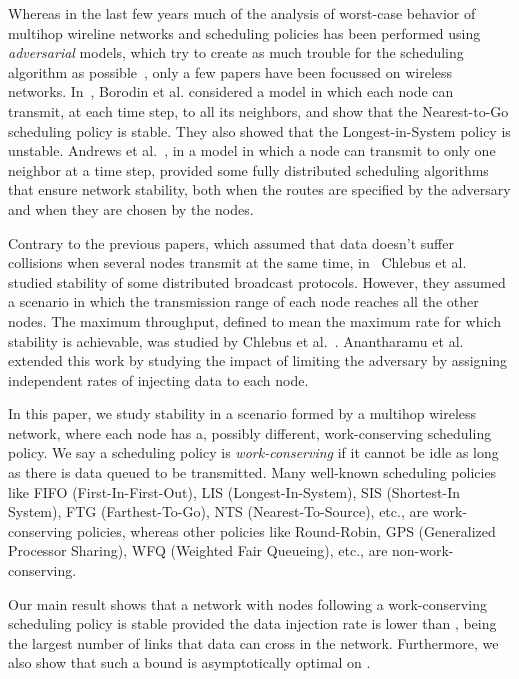 \documentclass[journal,twocolumn]{./IEEEtran}
\begin{document}
Whereas in the last few years much of the analysis of worst-case behavior of multihop wireline networks and scheduling policies has been performed using \emph{adversarial} models,
which
try to create as much trouble for the scheduling algorithm as possible~\cite{aafkll01,Ech:Uni}, 
only a few papers have been focussed on wireless networks. In~\cite{DBLP:journals/join/BorodinOR04}, Borodin et al. considered a model in which each node can transmit, at each time step, to all its neighbors, and show that the Nearest-to-Go scheduling policy is stable. They also showed that the Longest-in-System policy is unstable. Andrews et al.~\cite{DBLP:journals/talg/AndrewsZ07}, in a model in which a node can transmit to only one neighbor at 
a
time step, 
provided some fully distributed scheduling algorithms that ensure network stability, both when the routes are specified by the adversary and when they are chosen by the nodes.

Contrary to the previous papers, which assumed that data doesn't suffer collisions when several nodes transmit at the same time, in~\cite{1146398} Chlebus et al. studied stability of some distributed broadcast protocols. However, they assumed a scenario in which the transmission range of each node reaches all the other nodes. The maximum throughput, defined to mean the maximum rate for which stability is achievable, was studied by Chlebus et al.~\cite{DBLP:journals/dc/ChlebusKR09}. Anantharamu et al.~\cite{DBLP:conf/opodis/AnantharamuCR09} extended this work by studying the impact of limiting the adversary by assigning independent rates of injecting data 
to
each node.

In this paper, we study stability in a scenario formed by a multihop wireless network, where each node has a, possibly different, work-conserving scheduling policy. We say a scheduling policy is {\em work-conserving} if it cannot be idle as long as there is data queued to be transmitted. Many well-known scheduling policies like FIFO (First-In-First-Out), LIS (Longest-In-System), SIS (Shortest-In System), FTG (Farthest-To-Go), NTS (Nearest-To-Source), etc., are work-conserving policies, whereas other policies like Round-Robin, GPS (Generalized Processor Sharing), WFQ (Weighted Fair Queueing), etc., are non-work-conserving.



Our main result shows that a network with nodes following a work-conserving scheduling policy is stable provided the data injection rate is lower than , being  the largest number of links that data can cross in the network. Furthermore, we also show that such a bound is asymptotically optimal on .
\end{document}
